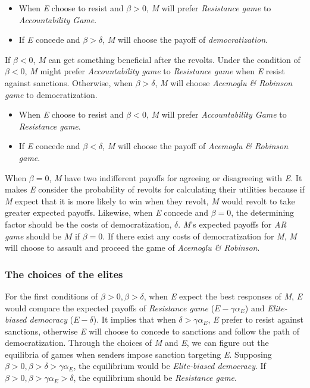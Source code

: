 \documentclass[11pt, letterpage]{article}
\begin{document}
\begin{itemize}
	\item When \textit{E} choose to resist and $\beta > 0$, \textit{M} will prefer \textit{Resistance game} to \textit{Accountability Game}.
	\item If \textit{E} concede and $\beta > \delta$, \textit{M} will choose the payoff of \textit{democratization}.
\end{itemize}
	
If $\beta < 0$, \textit{M} can get something beneficial after the revolts. Under the condition of $\beta < 0$, \textit{M} might prefer \textit{Accountability game} to \textit{Resistance game} when \textit{E} resist against sanctions. Otherwise, when $\beta > \delta$, \textit{M} will choose \textit{Acemoglu \& Robinson game} to democratization. 

\begin{itemize}
	\item When \textit{E} choose to resist and $\beta < 0$, \textit{M} will prefer \textit{Accountability Game} to \textit{Resistance game}.
	\item If \textit{E} concede and $\beta < \delta$, \textit{M} will choose the payoff of \textit{Acemoglu \& Robinson game}.
\end{itemize}
	
When $\beta = 0$, \textit{M} have two indifferent payoffs for agreeing or disagreeing with \textit{E}. It makes \textit{E} consider the probability of revolts for calculating their utilities because if \textit{M} expect that it is more likely to win when they revolt, \textit{M} would revolt to take greater expected payoffs.    Likewise, when \textit{E} concede and $\beta = 0$, the determining factor should be the costs of democratization, $\delta$. \textit{M}'s expected payoffs for \textit{AR game} should be $M$ if $\beta = 0$. If there exist any costs of democratization for \textit{M}, \textit{M} will choose to assault and proceed the game of \textit{Acemoglu \& Robinson}. 
	
\subsubsection*{The choices of the elites}
	
For the first conditions of $\beta > 0, \beta > \delta$, when \textit{E} expect the best responses of \textit{M}, \textit{E} would compare the expected payoffs of \textit{Resistance game} ($E-\gamma\alpha_{E}$) and \textit{Elite-biased democracy} ($E-\delta$). It implies that when $\delta > \gamma\alpha_{E}$, \textit{E} prefer to resist against sanctions, otherwise \textit{E} will choose to concede to sanctions and follow the path of democratization. Through the choices of \textit{M} and \textit{E}, we can figure out the equilibria of games when senders impose sanction targeting \textit{E}. Supposing $\beta > 0, \beta > \delta > \gamma\alpha_{E}$, the equilibrium would be \textit{Elite-biased democracy}. If $\beta > 0, \beta > \gamma\alpha_{E} > \delta$, the equilibrium should be \textit{Resistance game}.
	
\end{document}
